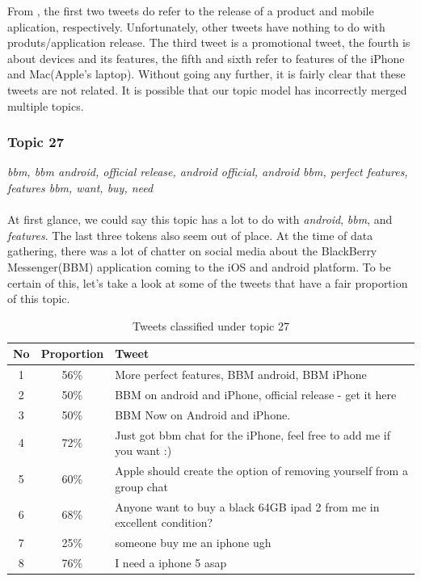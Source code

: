 From , the first two tweets do refer to the release of a product and
mobile aplication, respectively. Unfortunately, other tweets have nothing to do with
produts/application release. The third tweet is a promotional tweet, the fourth is about devices and
its features, the fifth and sixth refer to features of the iPhone and Mac(Apple's laptop). Without
going any further, it is fairly clear that these tweets are not related. It is possible that our
topic model has incorrectly merged multiple topics.


\subsubsection{Topic 27}
\label{sec:topic-27}
\textit{bbm, bbm android, official release, android official, android bbm, perfect features,
features bbm, want, buy, need} \\\\
At first glance, we could say this topic has a lot to do with \textit{android}, \textit{bbm}, and
\textit{features}. The last three tokens also seem out of place. At the time of data gathering,
there was a lot of chatter on social media about the BlackBerry Messenger(BBM) application coming to
the iOS and android platform. To be certain of this, let's take a look at some of the tweets that
have a fair proportion of this topic.

\begin{table}[H]
  \begin{tabular}{c c p{13cm}} \toprule
    No & Proportion & Tweet \\ \midrule
    1  & 56\%       & More perfect features, BBM android, BBM iPhone \\ \midrule
    2  & 50\%       & BBM on android and iPhone, official release - get it here \\ \midrule
    3  & 50\%       & BBM Now on Android and iPhone. \\ \midrule
    4  & 72\%       & Just got bbm chat for the iPhone, feel free to add me if you want :) \\ \midrule
    5  & 60\%       & Apple should create the option of removing yourself from a group chat \\ \midrule
    6  & 68\%       & Anyone want to buy a black 64GB ipad 2 from me in excellent condition? \\ \midrule
    7  & 25\%       & someone buy me an iphone ugh \\ \midrule
    8  & 76\%       & I need a iphone 5 asap \\ \bottomrule
  \end{tabular}
  \caption{Tweets classified under topic 27}
  \label{tab:topic-27-tweets}
\end{table}

